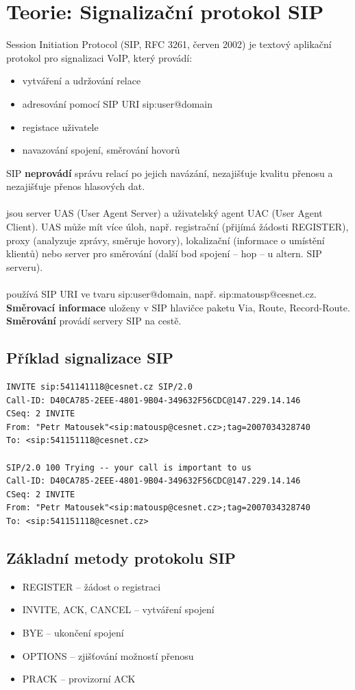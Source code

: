
\section{Teorie: Signalizační protokol SIP}
\label{ntp}
Session Initiation Protocol (SIP, RFC 3261, červen 2002) je textový aplikační protokol pro signalizaci VoIP, který provádí:
\begin{itemize}
    \item vytváření a udržování relace
    \item adresování pomocí SIP URI sip:user@domain
    \item registace uživatele
    \item navazování spojení, směrování hovorů
\end{itemize}

\noindent SIP {\bf neprovádí} správu relací po jejich navázání, nezajišťuje kvalitu přenosu a nezajišťuje přenos hlasových dat. \\
~\\
 jsou server UAS (User Agent Server) a uživatelský agent UAC (User Agent Client). UAS může mít více úloh,
např. registrační (přijímá žádosti REGISTER), proxy (analyzuje zprávy, směruje hovory), lokalizační (informace o umístění klientů)
nebo server pro směrování (další bod spojení – hop – u altern. SIP serveru). \\
~\\
 používá SIP URI ve tvaru sip:user@domain, např. sip:matousp@cesnet.cz. {\bf Směrovací informace} uloženy v SIP
hlavičce paketu Via, Route, Record-Route. {\bf Směrování} provádí servery SIP na cestě.

\subsection*{Příklad signalizace SIP}
\begin{lstlisting}
INVITE sip:541141118@cesnet.cz SIP/2.0
Call-ID: D40CA785-2EEE-4801-9B04-349632F56CDC@147.229.14.146
CSeq: 2 INVITE
From: "Petr Matousek"<sip:matousp@cesnet.cz>;tag=2007034328740
To: <sip:541151118@cesnet.cz>

SIP/2.0 100 Trying -- your call is important to us
Call-ID: D40CA785-2EEE-4801-9B04-349632F56CDC@147.229.14.146
CSeq: 2 INVITE
From: "Petr Matousek"<sip:matousp@cesnet.cz>;tag=2007034328740
To: <sip:541151118@cesnet.cz>
\end{lstlisting}

\subsection*{Základní metody protokolu SIP}
\begin{itemize}
    \item REGISTER – žádost o registraci
    \item INVITE, ACK, CANCEL – vytváření spojení
    \item BYE – ukončení spojení
    \item OPTIONS – zjišťování možností přenosu
    \item PRACK – provizorní ACK
\end{itemize}

